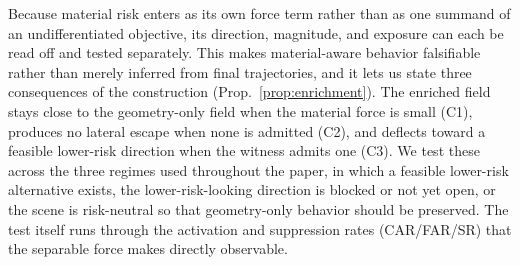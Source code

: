 
Because material risk enters as its own force term rather than as one summand of an undifferentiated objective, its direction, magnitude, and exposure can each be read off and tested separately. This makes material-aware behavior falsifiable rather than merely inferred from final trajectories, and it lets us state three consequences of the construction (Prop.~\ref{prop:enrichment}). The enriched field stays close to the geometry-only field when the material force is small (C1), produces no lateral escape when none is admitted (C2), and deflects toward a feasible lower-risk direction when the witness admits one (C3). We test these across the three regimes used throughout the paper, in which a feasible lower-risk alternative exists, the lower-risk-looking direction is blocked or not yet open, or the scene is risk-neutral so that geometry-only behavior should be preserved. The test itself runs through the activation and suppression rates (CAR/FAR/SR) that the separable force makes directly observable.


